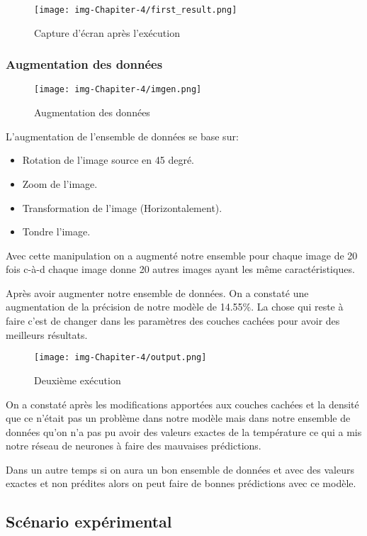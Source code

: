 \documentclass[12pt]{article}
\begin{document}
\newpage
\begin{figure}[h]
	\centering
	\texttt{[image: img-Chapiter-4/first\_result.png]}
	\caption{Capture d’écran après l’exécution}
\end{figure}


\subsubsection*{Augmentation des données}

\begin{figure}[h]
	\centering
	\texttt{[image: img-Chapiter-4/imgen.png]}
	\caption{Augmentation des données}
\end{figure}		
L'augmentation de l'ensemble de données se base sur:
\begin{itemize}
	\item Rotation de l’image source en 45\textdegree{} degré.
	\item Zoom de l'image.
	\item Transformation de l'image (Horizontalement).
	\item Tondre l'image.\\
\end{itemize}
Avec cette manipulation on a augmenté notre ensemble pour chaque image  de 20 fois c-à-d chaque image donne 20 autres images ayant les même caractéristiques.

Après avoir augmenter notre ensemble de données. On a constaté une augmentation de la précision de notre modèle de 14.55\%. La chose qui reste à faire c’est de changer dans les paramètres des couches cachées pour avoir des meilleurs résultats.
\newpage
\begin{figure}[h]
	\centering
	\texttt{[image: img-Chapiter-4/output.png]}
	\caption{Deuxième exécution}
\end{figure}

On a constaté après les modifications apportées aux couches cachées et la densité que ce n'était pas un problème dans notre modèle mais dans notre ensemble de données qu’on n'a pas pu avoir des valeurs exactes de la température ce qui a mis notre réseau de neurones à faire des mauvaises prédictions.

Dans un autre temps si on aura un bon ensemble de données et avec des valeurs exactes et non prédites alors on peut faire de bonnes prédictions avec ce modèle.

\newpage
\subsection{Scénario expérimental}
\end{document}
